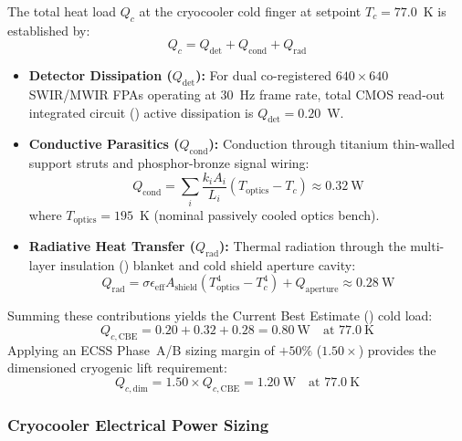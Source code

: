 The total heat load $Q_c$ at the cryocooler cold finger at setpoint $T_c = 77.0$~K is established by:
\begin{equation}
    Q_c = Q_{\text{det}} + Q_{\text{cond}} + Q_{\text{rad}}
\end{equation}
\begin{itemize}
    \item \textbf{Detector Dissipation ($Q_{\text{det}}$):} For dual co-registered $640 \times 640$ SWIR/MWIR FPAs operating at $30$~Hz frame rate, total CMOS read-out integrated circuit () active dissipation is $Q_{\text{det}} = 0.20$~W.
    \item \textbf{Conductive Parasitics ($Q_{\text{cond}}$):} Conduction through titanium thin-walled support struts and phosphor-bronze signal wiring:
    \begin{equation}
        Q_{\text{cond}} = \sum_{i} \frac{k_i A_i}{L_i} (T_{\text{optics}} - T_c) \approx 0.32~\text{W}
    \end{equation}
    where $T_{\text{optics}} = 195$~K (nominal passively cooled optics bench).
    \item \textbf{Radiative Heat Transfer ($Q_{\text{rad}}$):} Thermal radiation through the multi-layer insulation () blanket and cold shield aperture cavity:
    \begin{equation}
        Q_{\text{rad}} = \sigma \epsilon_{\text{eff}} A_{\text{shield}} (T_{\text{optics}}^4 - T_c^4) + Q_{\text{aperture}} \approx 0.28~\text{W}
    \end{equation}
\end{itemize}
Summing these contributions yields the Current Best Estimate () cold load:
\begin{equation}
    Q_{c,\text{CBE}} = 0.20 + 0.32 + 0.28 = 0.80~\text{W} \quad \text{at } 77.0~\text{K}
\end{equation}
Applying an ECSS Phase~A/B sizing margin of $+50\%$ ($1.50\times$) provides the dimensioned cryogenic lift requirement:
\begin{equation}
    Q_{c,\text{dim}} = 1.50 \times Q_{c,\text{CBE}} = 1.20~\text{W} \quad \text{at } 77.0~\text{K}
\end{equation}

\subsubsection{Cryocooler Electrical Power Sizing}


